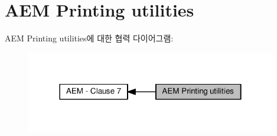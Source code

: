 \hypertarget{group__aem__print}{}\section{A\+EM Printing utilities}
\label{group__aem__print}
A\+EM Printing utilities에 대한 협력 다이어그램\+:
\nopagebreak
\begin{figure}[H]
\begin{center}
\leavevmode
\includegraphics[width=310pt]{group__aem__print}
\end{center}
\end{figure}
